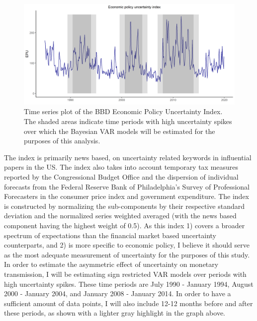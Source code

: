 \documentclass[12pt,a4paper]{article}
\begin{document}
\begin{center}
\begin{figure}[h!]
	\includegraphics[width=0.9\linewidth]{epu.png}
		\caption{Time series plot of the BBD Economic Policy Uncertainty Index. The shaded areas indicate time periods with high uncertainty spikes over which the Bayesian VAR models will be estimated for the purposes of this analysis.}
\end{figure}
\end{center}
\noindent The index is primarily news based, on uncertainty related keywords in influential papers in the US. The index also takes into account temporary tax measures reported by the Congressional Budget Office and the dispersion of individual forecasts from the Federal Reserve Bank of Philadelphia's Survey of Professional Forecasters in the consumer price index and government expenditure. The index is constructed by normalizing the sub-components by their respective standard deviation and the normalized series weighted averaged (with the news based component having the highest weight of 0.5). As this index 1) covers a broader spectrum of expectations than the financial market based uncertainty counterparts, and 2) is more specific to economic policy, I believe it should serve as the most adequate measurement of uncertainty for the purposes of this study.\\

In order to estimate the asymmetric effect of uncertainty on monetary transmission, I will be estimating sign restricted VAR models over periods with high uncertainty spikes. These time periods are July 1990 - January 1994,  August 2000 - January 2004, and January 2008 - January 2014. In order to have a sufficient amount of data points, I will also include 12-12 months before and after these periods, as shown with a lighter gray highlight in the graph above.
	
\end{document}
